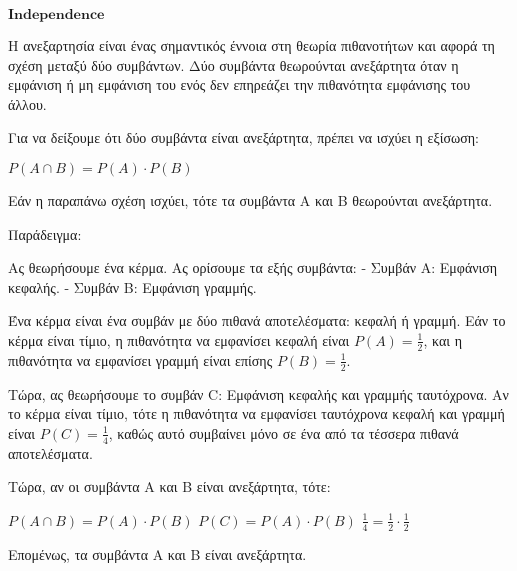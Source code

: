 \documentclass[11pt]{article}
\makeatletter
\newcommand{\boxspacing}{\kern\kvtcb@left@rule\kern\kvtcb@boxsep}
\newcommand{\prompt}[4]{
        {\ttfamily\llap{{\color{#2}[#3]:\hspace{3pt}#4}}\vspace{-\baselineskip}}
    }
\makeatother
\begin{document}
    \begin{tcolorbox}[breakable, size=fbox, boxrule=1pt, pad at break*=1mm,colback=cellbackground, colframe=cellborder]
\prompt{In}{incolor}{ }{\boxspacing}
\begin{Verbatim}[commandchars=\\\{\}]

\end{Verbatim}
\end{tcolorbox}

    \(\textbf{Independence}\)

    Η ανεξαρτησία είναι ένας σημαντικός έννοια στη θεωρία πιθανοτήτων και
αφορά τη σχέση μεταξύ δύο συμβάντων. Δύο συμβάντα θεωρούνται ανεξάρτητα
όταν η εμφάνιση ή μη εμφάνιση του ενός δεν επηρεάζει την πιθανότητα
εμφάνισης του άλλου.

Για να δείξουμε ότι δύο συμβάντα είναι ανεξάρτητα, πρέπει να ισχύει η
εξίσωση:

$ P(A \cap B) = P(A) \cdot P(B) $

Εάν η παραπάνω σχέση ισχύει, τότε τα συμβάντα A και B θεωρούνται
ανεξάρτητα.

Παράδειγμα:

Ας θεωρήσουμε ένα κέρμα. Ας ορίσουμε τα εξής συμβάντα: - Συμβάν A:
Εμφάνιση κεφαλής. - Συμβάν B: Εμφάνιση γραμμής.

Ένα κέρμα είναι ένα συμβάν με δύο πιθανά αποτελέσματα: κεφαλή ή γραμμή.
Εάν το κέρμα είναι τίμιο, η πιθανότητα να εμφανίσει κεφαλή είναι $ P(A)
= \frac{1}{2} $, και η πιθανότητα να εμφανίσει γραμμή είναι επίσης $
P(B) = \frac{1}{2} $.

Τώρα, ας θεωρήσουμε το συμβάν C: Εμφάνιση κεφαλής και γραμμής
ταυτόχρονα. Αν το κέρμα είναι τίμιο, τότε η πιθανότητα να εμφανίσει
ταυτόχρονα κεφαλή και γραμμή είναι $ P(C) = \frac{1}{4} $, καθώς αυτό
συμβαίνει μόνο σε ένα από τα τέσσερα πιθανά αποτελέσματα.

Τώρα, αν οι συμβάντα A και B είναι ανεξάρτητα, τότε:

$ P(A \cap B) = P(A) \cdot P(B) $ $ P(C) = P(A) \cdot P(B) $ $
\frac{1}{4} = \frac{1}{2} \cdot \frac{1}{2} $

Επομένως, τα συμβάντα A και B είναι ανεξάρτητα.

    \begin{tcolorbox}[breakable, size=fbox, boxrule=1pt, pad at break*=1mm,colback=cellbackground, colframe=cellborder]
\prompt{In}{incolor}{ }{\boxspacing}
\begin{Verbatim}[commandchars=\\\{\}]

\end{Verbatim}
\end{tcolorbox}
\end{document}
